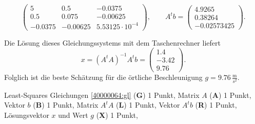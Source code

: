 \begin{loesung}
\begin{teilaufgaben}
\[\begin{pmatrix}
5 & 0.5 & -0.0375\\
0.5 & 0.075 & -0.00625\\
-0.0375 & -0.00625 & 5.53125\cdot 10^{-4}
\end{pmatrix},
\qquad
A^tb
=
\begin{pmatrix}
4.9265\\
0.38264\\
-0.02573425
\end{pmatrix}.
\]
\item
Die Lösung dieses Gleichungssystems mit dem Taschenrechner liefert
\[
  x = (A^tA)^{-1}A^tb = 
  \begin{pmatrix}
    1.4\\
    -3.42\\
   9.76 
  \end{pmatrix}.
\]
Folglich ist die beste Schätzung für die
örtliche Beschleunigung $g = 9.76\,\frac{\text{m}}{s^2}$.
\end{teilaufgaben}
\end{loesung}

\begin{bewertung}
Least-Squares Gleichungen \eqref{40000064:gl} ({\bf G}) 1 Punkt,
Matrix $A$ ({\bf A}) 1 Punkt,
Vektor $b$ ({\bf B}) 1 Punkt,
Matrix $A^tA$ ({\bf L}) 1 Punkt,
Vektor $A^tb$ ({\bf R}) 1 Punkt,
Lösungsvektor $x$ und Wert $g$ ({\bf X}) 1 Punkt,
\end{bewertung}
